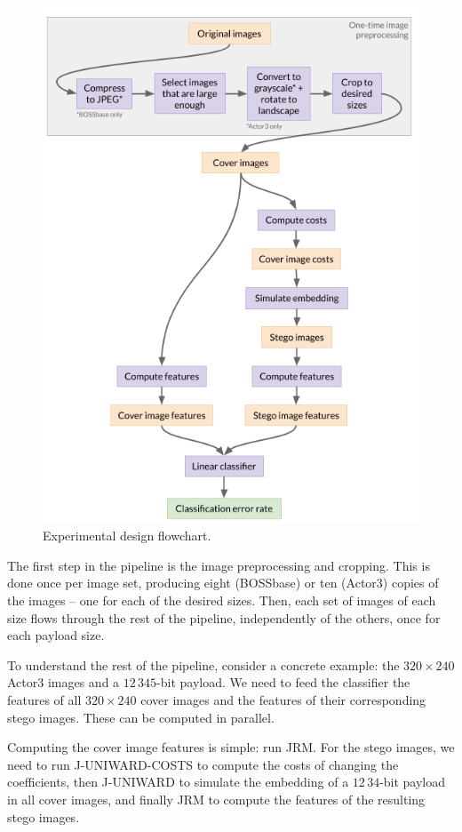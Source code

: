 \documentclass[11pt,a4paper,twoside,openright]{report}
\begin{document}
\begin{figure}[htbp]
	\begin{center}
		\includegraphics[width=0.75\linewidth]{experimental_design_diagram.png}
		\caption{Experimental design flowchart.}
		\label{fig:experimental-design-flowchart}
	\end{center}
\end{figure}

The first step in the pipeline is the image preprocessing and cropping. This is done once per image set, producing eight (BOSSbase) or ten (Actor3) copies of the images -- one for each of the desired sizes. Then, each set of images of each size flows through the rest of the pipeline, independently of the others, once for each payload size.

To understand the rest of the pipeline, consider a concrete example: the $320\times240$ Actor3 images and a $12\,345$-bit payload. We need to feed the classifier the features of all $320\times240$ cover images and the features of their corresponding stego images. These can be computed in parallel.

Computing the cover image features is simple: run JRM. For the stego images, we need to run J-UNIWARD-COSTS to compute the costs of changing the coefficients, then J-UNIWARD to simulate the embedding of a $12\,34$-bit payload in all cover images, and finally JRM to compute the features of the resulting stego images.
\end{document}
